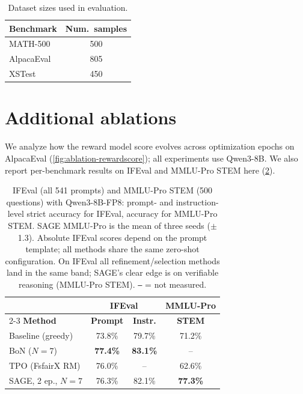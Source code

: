 \documentclass[letterpaper]{article} %
\newcommand{\method}{SAGE}
\begin{document}
\begin{table}[htbp]
\centering
\begin{small}
\begin{sc}
\begin{tabular}{lc}
\toprule
\textbf{Benchmark} & \textbf{Num.\ samples} \\
\midrule
MATH-500 & 500 \\
AlpacaEval & 805 \\
XSTest & 450 \\
\bottomrule
\end{tabular}
\end{sc}
\end{small}
\caption{Dataset sizes used in evaluation.}
\label{tab:appendix-dataset-stats}
\end{table}

\section{Additional ablations}
\label{app:ablation-more}
\noindent We analyze how the reward model score evolves across optimization epochs on AlpacaEval (\cref{fig:ablation-rewardscore}); all experiments use Qwen3-8B. \textcolor{orange!85!black}{We also report per-benchmark results on IFEval and MMLU-Pro STEM here (\cref{tab:additional-benchmarks}).}


\begin{table}[htbp]
\centering
\color{orange!85!black}
\setlength{\tabcolsep}{3.5pt}
\begin{small}
\begin{sc}
\begin{tabular}{lccc}
\toprule
 & \multicolumn{2}{c}{\textbf{IFEval}} & \textbf{MMLU-Pro} \\
\cmidrule(lr){2-3}
\textbf{Method} & \textbf{Prompt} & \textbf{Instr.} & \textbf{STEM} \\
\midrule
Baseline (greedy)            & 73.8\% & 79.7\% & 71.2\% \\
BoN ($N{=}7$)                & \textbf{77.4\%} & \textbf{83.1\%} & -- \\
TPO (FsfairX RM)             & 76.0\% & -- & 62.6\% \\
\method{}, 2 ep., $N{=}7$    & 76.3\% & 82.1\% & \textbf{77.3\%} \\
\bottomrule
\end{tabular}
\end{sc}
\end{small}
\caption{\textcolor{orange!85!black}{IFEval (all 541 prompts) and MMLU-Pro STEM (500 questions) with Qwen3-8B-FP8: prompt- and instruction-level strict accuracy for IFEval, accuracy for MMLU-Pro STEM. \method{} MMLU-Pro is the mean of three seeds ($\pm$1.3). Absolute IFEval scores depend on the prompt template; all methods share the same zero-shot configuration. On IFEval all refinement/selection methods land in the same band; \method{}'s clear edge is on verifiable reasoning (MMLU-Pro STEM). \texttt{--} = not measured.}}
\label{tab:additional-benchmarks}
\end{table}
\end{document}
